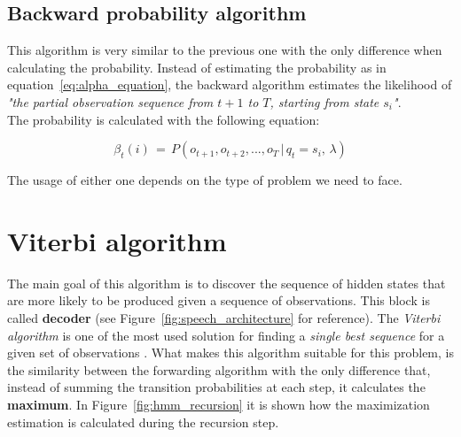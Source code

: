 \subsection{Backward probability algorithm}
This algorithm is very similar to the previous one with the only difference when calculating the probability. Instead of estimating the probability as in equation~\ref{eq:alpha_equation}, the backward algorithm estimates the likelihood of \textit{"the partial observation sequence from $t+1$ to $T$, starting from state $s_{i}$"}\cite{hmm_tutorial}. \\

\noindent The probability is calculated with the following equation:

\begin{equation}
\label{eq:backward_algorithm}
	\beta_{t}(i) \, = \, P(o_{t+1}, o_{t+2}, ... , o_{T} \, | \, q_{t} = s_{i}, \, \lambda)
\end{equation}

\noindent The usage of either one depends on the type of problem we need to face.


\section{Viterbi algorithm}
\label{sec:viterbi}
The main goal of this algorithm is to discover the sequence of hidden states that are more likely to be produced given a sequence of observations. This block is called \textbf{decoder} (see Figure~\ref{fig:speech_architecture} for reference). The \textit{Viterbi algorithm} is one of the most used solution for finding a \textit{single best sequence} for a given set of observations \cite{hmm_tutorial}. What makes this algorithm suitable for this problem, is the similarity between the forwarding algorithm with the only difference that, instead of summing the transition probabilities at each step, it calculates the \textbf{maximum}. In Figure~\ref{fig:hmm_recursion} it is shown how the maximization estimation is calculated during the recursion step.

